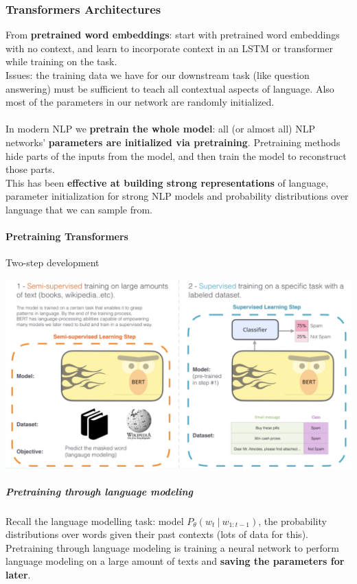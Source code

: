 \documentclass[10pt]{report}
\begin{document}
\subsubsection{Transformers Architectures}
From \textbf{pretrained word embeddings}: start with pretrained word embeddings with no context, and learn to incorporate context in an LSTM or transformer while training on the task.\\
Issues: the training data we have for our downstream task (like question answering) must be sufficient to teach all contextual aspects of language. Also most of the parameters in our network are randomly initialized.\\\\
In modern NLP we \textbf{pretrain the whole model}: all (or almost all) NLP networks' \textbf{parameters are initialized via pretraining}. Pretraining methods hide parts of the inputs from the model, and then train the model to reconstruct those parts.\\
This has been \textbf{effective at building strong representations} of language, parameter initialization for strong NLP models and probability distributions over language that we can sample from.
\pagebreak
\paragraph{Pretraining Transformers} Two-step development\begin{center}
	\includegraphics[scale=0.5]{74.png}
\end{center}
\subparagraph{Pretraining through language modeling} Recall the language modelling task: model $P_\theta(w_t\:|\:w_{1:t-1})$, the probability distributions over words given their past contexts (lots of data for this).\\Pretraining through language modeling is training a neural network to perform language modeling on a large amount of texts and \textbf{saving the parameters for later}.
\end{document}
